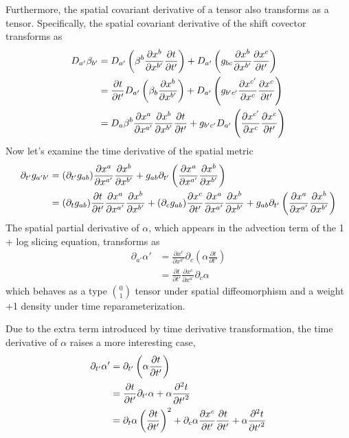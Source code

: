 \documentclass[letterpaper,nofootinbib,prd,amsmath,onecolumn]{revtex4-1}
\begin{document}
Furthermore, the spatial covariant derivative of a tensor also transforms as a tensor. Specifically, the spatial covariant derivative of the shift covector transforms as
\begin{align}
D_{a'}\beta_{b'} &= D_{a'}\left(\beta^{b}\frac{\partial x^{b}}{\partial x^{b'}}\frac{\partial t}{\partial t'}\right) + D_{a'}\left(g_{bc}\frac{\partial x^{b}}{\partial x^{b'}}\frac{\partial x^{c}}{\partial t'}\right)\notag\\
& = \frac{\partial t}{\partial t'}D_{a'}\left(\beta_{b}\frac{\partial x^{b}}{\partial x^{b'}}\right) + D_{a'}\left(g_{b'c'}\frac{\partial x^{c'}}{\partial x^{c}}\frac{\partial x^{c}}{\partial t'}\right)\notag\\
& = D_{a}\beta^{b}\frac{\partial x^{a}}{\partial x^{a'}}\frac{\partial x^{b}}{\partial x^{b'}}\frac{\partial t}{\partial t'} + g_{b'c'}D_{a'}\left(\frac{\partial x^{c'}}{\partial x^{c}}\frac{\partial x^{c}}{\partial t'}\right)
\end{align} 
Now let's examine the time derivative of the spatial metric
\begin{align}
\partial_{t'}g_{a'b'} & = (\partial_{t'}g_{ab})\frac{\partial x^{a}}{\partial x^{a'}}\frac{\partial x^{b}}{\partial x^{b'}} + g_{ab}\partial_{t'}\left(\frac{\partial x^{a}}{\partial x^{a'}}\frac{\partial x^{b}}{\partial x^{b'}}\right)\notag\\
& =  (\partial_{t}g_{ab})\frac{\partial t}{\partial t'}\frac{\partial x^{a}}{\partial x^{a'}}\frac{\partial x^{b}}{\partial x^{b'}} + (\partial_{c}g_{ab})\frac{\partial x^{c}}{\partial t'}\frac{\partial x^{a}}{\partial x^{a'}}\frac{\partial x^{b}}{\partial x^{b'}} + g_{ab}\partial_{t'}\left(\frac{\partial x^{a}}{\partial x^{a'}}\frac{\partial x^{b}}{\partial x^{b'}}\right)
\end{align}
The spatial partial derivative of $\alpha$, which appears in the advection term of the 1 + log slicing equation, transforms as 
\begin{align}
\partial_{a'}\alpha' & = \frac{\partial x^{c}}{\partial x^{a'}}\partial_{c}\left(\alpha \frac{\partial t}{\partial t'}\right)\\
& = \frac{\partial t}{\partial t'}\frac{\partial x^{c}}{\partial x^{a'}}\partial_{c}\alpha
\end{align}
which behaves as a type $0 \choose 1$ tensor under spatial diffeomorphism and a weight +1 density under time reparameterization.

Due to the extra term introduced by time derivative transformation, the time derivative of $\alpha$ raises a more interesting case, 
\begin{align}
\partial_{t'}\alpha' & = \partial_{t'}\left(\alpha\frac{\partial t}{\partial t'}\right)\notag\\
& = \frac{\partial t}{\partial t'}\partial_{t'}\alpha + \alpha\frac{\partial^{2}t}{\partial {t'}^{2}}\notag\\
& = \partial_{t}\alpha\left(\frac{\partial t}{\partial t'}\right)^{2} + \partial_{c}\alpha\frac{\partial x^{c}}{\partial t'}\frac{\partial t}{\partial t'} + \alpha\frac{\partial^{2}t}{\partial {t'}^{2}}
\end{align}
\end{document}
